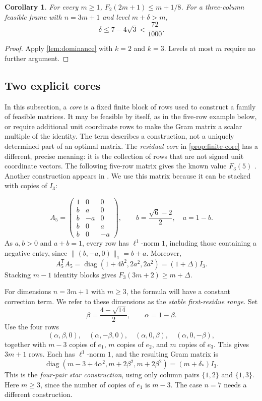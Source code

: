 \documentclass[11pt]{article}
\numberwithin{equation}{section}
\newtheorem{corollary}[corollary]{Corollary}
\theoremstyle{definition}
\theoremstyle{definition}
\newcommand{\F}{F_3}
\DeclareMathOperator{\diag}{diag}
\newcommand{\ds}{\delta_*}
\newcommand{\Dlt}{\Delta}
\begin{document}
\begin{corollary}\label{cor:two-dimensional}
For every $m\ge1$, $F_2(2m+1)\le m+1/8$.
For a three-column feasible frame with $n=3m+1$ and level $m+\delta>m$,
\[
 \delta\le7-4\sqrt3<\frac{72}{1000}.
\]
\end{corollary}
\begin{proof}
Apply \cref{lem:dominance} with $k=2$ and $k=3$.
Levels at most $m$ require no further argument.
\end{proof}

\subsection{Two explicit cores}
In this subsection, a \emph{core} is a fixed finite block of rows
used to construct a family of feasible matrices. It may be feasible
by itself, as in the five-row example below, or require additional
unit coordinate rows to make the Gram matrix a scalar multiple of
the identity. The term describes a construction, not a uniquely
determined part of an optimal matrix. The \emph{residual core} in
\cref{prop:finite-core} has a different, precise meaning: it is the
collection of rows that are not signed unit coordinate vectors.
The following five-row matrix gives the known value $F_3(5)$
\cite{Finch2003}.  Another construction appears in \cite{Firsching2014}.
We use this matrix because it can be stacked with copies of $I_3$:

\begin{equation}\label{eq:five-core}
 A_5=\begin{pmatrix}
 1&0&0\\ b&a&0\\ b&-a&0\\ b&0&a\\ b&0&-a
 \end{pmatrix},\qquad
 b=\frac{\sqrt6-2}{2},\quad a=1-b.
\end{equation}
As $a,b>0$ and $a+b=1$, every row has $\ell^1$-norm $1$,
including those containing a negative entry, since
$\|(b,-a,0)\|_1=b+a$.  Moreover,
\[
 A_5^{\mathsf T}A_5
 =\diag(1+4b^2,2a^2,2a^2)=(1+\Dlt)I_3.
\]
Stacking $m-1$ identity blocks gives $\F(3m+2)\ge m+\Dlt$.

For dimensions $n=3m+1$ with $m\ge3$, the formula will have a
constant correction term. We refer to these dimensions as the
\emph{stable first-residue range}. Set
\[
 \beta=\frac{4-\sqrt{14}}2,\qquad \alpha=1-\beta.
\]
Use the four rows
\begin{equation}\label{eq:star-mixed}
 (\alpha,\beta,0),\quad(\alpha,-\beta,0),\quad
 (\alpha,0,\beta),\quad(\alpha,0,-\beta),
\end{equation}
together with $m-3$ copies of $e_1$, $m$ copies of $e_2$, and $m$ copies
of $e_3$. This gives $3m+1$ rows. Each has $\ell^1$-norm $1$, and the
resulting Gram matrix is
\[
 \diag(m-3+4\alpha^2,m+2\beta^2,m+2\beta^2)
 =(m+\ds)I_3.
\]
This is the \emph{four-pair star construction}, using only column
pairs $\{1,2\}$ and $\{1,3\}$.
Here $m\ge3$, since the number of copies of $e_1$ is $m-3$.
The case $n=7$ needs a different construction.
\end{document}

